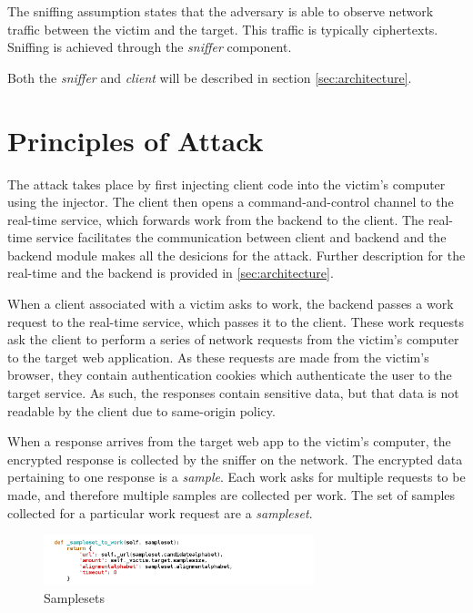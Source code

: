 The sniffing assumption states that the adversary is able to observe network
traffic between the victim and the target. This traffic is typically
ciphertexts. Sniffing is achieved through the \textit{sniffer} component.

Both the \textit{sniffer} and \textit{client} will be described in section 
\ref{sec:architecture}.



\section{Principles of Attack}\label{sec:principles}


The attack takes place by first injecting client code into the victim's
computer using the injector. The client then opens a command-and-control
channel to the real-time service, which forwards work from the backend to the
client. The real-time service facilitates the communication between client and
backend and the backend module makes all the desicions for the attack. Further 
description for the real-time and the backend is provided in \ref{sec:architecture}.

When a client associated with a victim asks to work, the backend passes a work
request to the real-time service, which passes it to the client. These work
requests ask the client to perform a series of network requests from the
victim's computer to the target web application. As these requests are made from the
victim's browser, they contain authentication cookies which authenticate the
user to the target service. As such, the responses contain sensitive data, but
that data is not readable by the client due to same-origin policy.

When a response arrives from the target web app to the victim's computer, the
encrypted response is collected by the sniffer on the network. The encrypted
data pertaining to one response is a \textit{sample}. Each work asks for
multiple requests to be made, and therefore multiple samples are collected per
work. The set of samples collected for a particular work request are a
\textit{sampleset}.


\begin{figure}[H] \caption{Samplesets} \centering
\includegraphics[width=0.7\textwidth]{diagrams/samplesets.png}\end{figure}

